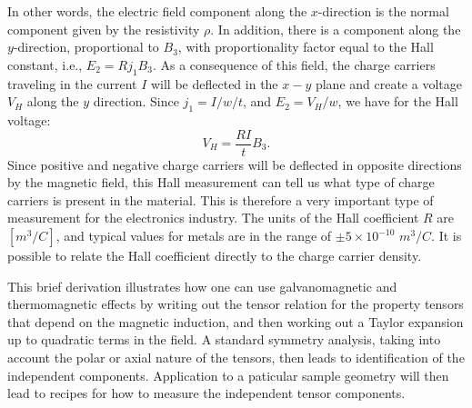 In other words, the electric field component along the $x$-direction is the normal component given by the resistivity $\rho$. In addition, there is a component along the $y$-direction, proportional to $B_3$, with proportionality factor equal to the Hall constant, i.e., $E_2=Rj_1B_3$.  As a consequence of this field, the charge carriers traveling in the current $I$ will be deflected in the $x-y$ plane and create a voltage $V_H$ along the $y$ direction.  Since $j_1 = I/w/t$, and $E_2=V_H/w$, we have for the Hall voltage:
 \begin{equation}
 	V_H = \frac{RI}{t}B_3.
\end{equation}
Since positive and negative charge carriers will be deflected in opposite directions by the magnetic field, this Hall measurement can tell us what type of charge carriers is present in the material. This is therefore a very important type of measurement for the electronics industry.  The units of the Hall coefficient  $R$ are $[m^3/C]$, and typical values for metals are in the range of $\pm 5\times 10^{-10}$ $m^3/C$.  It is possible to relate the Hall coefficient directly to the charge carrier density.

This brief derivation illustrates how one can use galvanomagnetic and thermomagnetic effects by writing out the tensor relation for the property tensors that depend on the magnetic induction, and then working out a Taylor expansion up to quadratic terms in the field.  A standard symmetry analysis, taking into account the polar or axial nature of the tensors, then leads to identification of the independent components.  Application to a paticular sample geometry will then lead to recipes for how to measure the independent tensor components.



